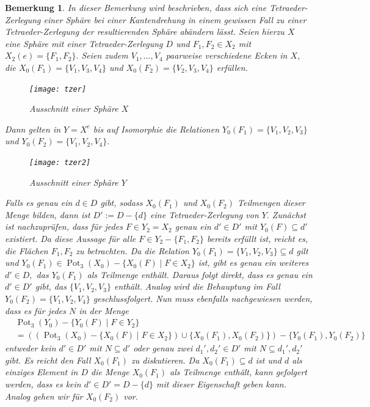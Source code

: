 \documentclass[12pt,titlepage,twoside,cleardoublepage]{article}
\theoremstyle{nummermitklammern}
\newtheorem{bemerkung}[temp]{Bemerkung}
\newtheorem{bemerkung}[zahl]{Bemerkung}
\numberwithin{equation}{section}
\DeclareMathOperator{\Pot}{Pot}
\begin{document}
\begin{bemerkung}\label{tzer}
In dieser Bemerkung wird beschrieben, dass sich eine Tetraeder-Zerlegung einer Sphäre bei einer Kantendrehung in einem gewissen Fall zu einer Tetraeder-Zerlegung der resultierenden Sphäre abändern lässt. Seien hierzu $X$ eine Sphäre mit einer Tetraeder-Zerlegung $D$ und $F_1,F_2\in X_2$  mit $X_2(e)=\{F_1,F_2\}.$ Seien zudem $V_1,\ldots,V_4$ paarweise verschiedene Ecken in $X$, die $X_0(F_1)=\{V_1,V_3,V_4\}$ und $X_0(F_2)=\{V_2,V_3,V_4\}$ erfüllen.
 \begin{figure}[H]
\begin{center}
\texttt{[image: tzer]}
\end{center}
\caption{Ausschnitt einer Sphäre $X$}
\end{figure}
 
 Dann gelten in $Y=X^e$ bis auf Isomorphie die Relationen ${Y}_0(F_1)=\{V_1,V_2,V_3\}$ und ${Y}_0(F_2)=\{V_1,V_2,V_4\}.$
 \begin{figure}[H]
\begin{center}
\texttt{[image: tzer2]}
\end{center}
\caption{Ausschnitt einer Sphäre $Y$}
\end{figure}
Falls es genau ein $d\in D$ gibt, sodass ${X}_0(F_1)$ und ${X}_0(F_2)$ Teilmengen dieser Menge bilden, dann ist $D':=D-\{d\}$ eine Tetraeder-Zerlegung von $Y.$ Zunächst ist nachzuprüfen, dass für jedes $F\in {Y}_2=X_2$ genau ein $d'\in D'$ mit ${Y}_0(F)\subseteq d'$ existiert. Da diese Aussage für alle $F\in Y_2-\{ F_1,F_2\}$ bereits erfüllt ist, reicht es, die Flächen $F_1,F_2$ zu betrachten. Da die Relation ${Y}_0(F_1)=\{V_1,V_2,V_3\}\subseteq d$  gilt und  $Y_0(F_1) \in \Pot_3(X_0)-\{X_0(F)\mid F\in X_2\}$ ist, gibt es genau ein weiteres $d'\in D,$ das ${Y}_0(F_1)$ als Teilmenge enthält. Daraus folgt direkt, dass es genau ein $d'\in D'$ gibt, das $\{V_1,V_2,V_3\}$ enthält. Analog wird die Behauptung im Fall ${Y}_0(F_2)=\{V_1,V_2,V_4\}$ geschlussfolgert.
Nun muss ebenfalls nachgewiesen werden, dass es für jedes $N$ in der Menge 
\begin{align*}
 &\Pot_3({Y}_0)-\{{Y}_0(F)\mid F\in {Y}_2\}\\
 &=((\Pot_3({X}_0)-\{{X}_0(F)\mid F\in {X}_2\})\cup \{X_0(F_1),X_0(F_2)\})-\{{Y}_0(F_1),{Y}_0(F_2)\}
 \end{align*}
  entweder kein $d'\in D'$ mit $N\subseteq d'$ 
  oder genau zwei $d_1',d_2'\in D'$ mit $N\subseteq d_1',d_2'$ gibt. 
  Es reicht den Fall $X_0(F_1)$ zu diskutieren. Da $X_0(F_1)\subseteq d$ ist und $d$ als einziges Element in $D$ die Menge $X_0(F_1)$ als Teilmenge enthält, kann gefolgert werden, dass es kein $d'\in D'=D-\{d\}$ mit dieser Eigenschaft geben kann. Analog gehen wir für $X_0(F_2) $ vor.
\end{bemerkung}
\end{document}
